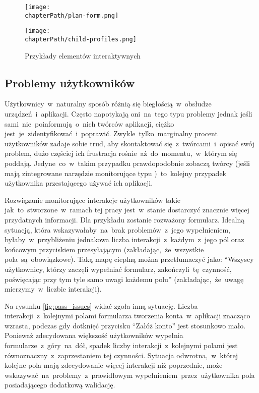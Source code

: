 \bigskip
\begin{figure}[H]
\centering
\begin{minipage}{.3\textwidth}
	\centering
	\texttt{[image: \\chapterPath/plan-form.png]}
\end{minipage}
\begin{minipage}{.4\textwidth}
	\centering
	\texttt{[image: \\chapterPath/child-profiles.png]}
\end{minipage}
\bigskip
\caption{Przykłady elementów interaktywnych}
\label{fig:interactive_areas}
\end{figure}

\subsection{Problemy użytkowników}
Użytkownicy~w~naturalny sposób różnią się biegłością~w~obsłudze urządzeń~i~aplikacji. Często napotykają oni~na~tego typu problemy jednak jeśli sami~nie~poinformują~o~nich twórców aplikacji, ciężko jest~je~zidentyfikować~i~poprawić. Zwykle~tylko~marginalny procent użytkowników zadaje sobie trud, aby skontaktować się~z~twórcami~i~opisać swój problem, dużo częściej ich frustracja rośnie~aż~do~momentu,~w~którym się poddają. Jedyne~co~w~takim przypadku prawdopodobnie zobaczą twórcy (jeśli mają zintegrowane narzędzie monitorujące typu )~to~kolejny przypadek użytkownika przestającego używać ich aplikacji. 

Rozwiązanie monitorujące interakcje użytkowników takie jak~to~stworzone~w~ramach tej pracy jest~w~stanie dostarczyć znacznie więcej przydatnych informacji. Dla przykładu zostanie rozważony formularz. Idealną sytuacją, która wskazywałaby~na~brak problemów~z~jego wypełnieniem, byłaby~w~przybliżeniu jednakowa liczba interakcji~z~każdym~z~jego pól oraz końcowym przyciskiem przesyłającym (zakładając,~że~wszystkie pola~są~obowiązkowe). Taką mapę cieplną można przetłumaczyć jako: ``Wszyscy użytkownicy, którzy zaczęli wypełniać formularz, zakończyli~tę~czynność, poświęcając przy tym tyle samo uwagi każdemu polu'' (zakładając,~że~uwagę mierzymy~w~liczbie interakcji). 

Na rysunku \ref{fig:pass_issues} widać zgoła inną sytuację. Liczba interakcji~z~kolejnymi polami formularza tworzenia konta~w~aplikacji znacząco wzrasta, podczas gdy dotknięć przycisku ``Załóż konto'' jest stosunkowo mało. Ponieważ zdecydowana większość użytkowników wypełnia formularze~z~góry~na~dół, spadek liczby interakcji~z~kolejnymi polami jest równoznaczny~z~zaprzestaniem tej czynności. Sytuacja odwrotna,~w~której kolejne pola mają zdecydowanie więcej interakcji niż poprzednie, może wskazywać~na~problemy~z~prawidłowym wypełnieniem~przez~użytkownika pola posiadającego dodatkową walidację. 

